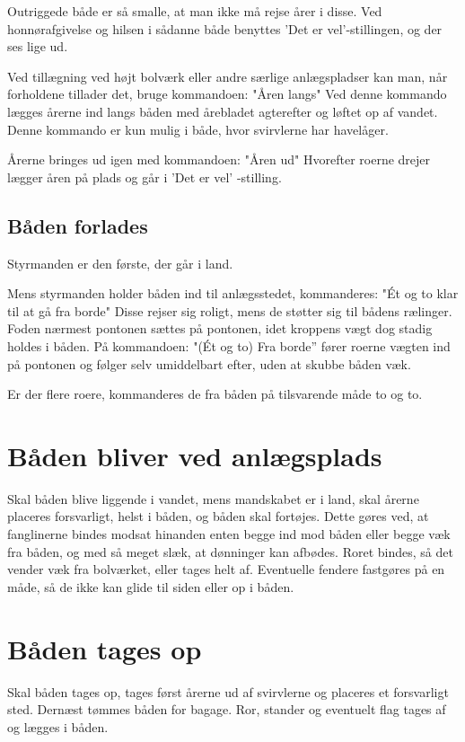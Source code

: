\documentclass{article}
\begin{document}
Outriggede både er så smalle, at man ikke må rejse årer i disse. Ved
honnørafgivelse og hilsen i sådanne både benyttes ’Det er
vel’-stillingen, og der ses lige ud.

Ved tillægning ved højt bolværk eller andre særlige anlægspladser kan
man, når forholdene tillader det, bruge kommandoen: "Åren langs" Ved
denne kommando lægges årerne ind langs båden med årebladet agterefter og
løftet op af vandet. Denne kommando er kun mulig i både, hvor svirvlerne
har havelåger.

Årerne bringes ud igen med kommandoen: "Åren ud" Hvorefter roerne drejer
lægger åren på plads og går i ’Det er vel’ -stilling.

\subsection{Båden forlades}

Styrmanden er den første, der går i land.

Mens styrmanden holder båden ind til anlægsstedet, kommanderes: "Ét og to
klar til at gå fra borde" Disse rejser sig roligt, mens de støtter sig
til bådens rælinger. Foden nærmest pontonen sættes på pontonen, idet
kroppens vægt dog stadig holdes i båden. På kommandoen: "(Ét og to) Fra
borde” fører roerne vægten ind på pontonen og følger selv umiddelbart
efter, uden at skubbe båden væk.

Er der flere roere, kommanderes de fra båden på tilsvarende måde to og
to.

\section{Båden bliver ved anlægsplads}

Skal båden blive liggende i vandet, mens mandskabet er i land, skal
årerne placeres forsvarligt, helst i båden, og båden skal fortøjes. Dette
gøres ved, at fanglinerne bindes modsat hinanden enten begge ind mod
båden eller begge væk fra båden, og med så meget slæk, at dønninger kan
afbødes. Roret bindes, så det vender væk fra bolværket, eller tages helt
af. Eventuelle fendere fastgøres på en måde, så de ikke kan glide til
siden eller op i båden.

\section{Båden tages op}

Skal båden tages op, tages først årerne ud af svirvlerne og placeres et
forsvarligt sted. Dernæst tømmes båden for bagage. Ror, stander og
eventuelt flag tages af og lægges i båden.
\end{document}
